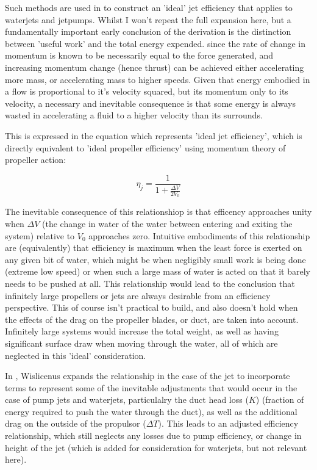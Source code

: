 \documentclass{article}\usepackage[]{graphicx}\usepackage[]{color}
\begin{document}
Such methods are used in \cite[8-14]{wislicenus1973} to construct an 'ideal' jet efficiency that applies to waterjets and jetpumps. Whilst I won't repeat the full expansion here, but a fundamentally important early conclusion of the derivation is the distinction between 'useful work' and the total energy expended. since the rate of change in momentum is known to be necessarily equal to the force generated, and increasing momentum change (hence thrust) can be achieved either accelerating more mass, or accelerating mass to higher speeds.   Given that energy embodied in a flow is proportional to it's velocity squared, but its momentum only to its velocity, a necessary and inevitable consequence is that some energy is always wasted in accelerating a fluid to a higher velocity than its surrounds.

This is expressed in the equation which represents 'ideal jet efficiency', which is directly equivalent to 'ideal propeller efficiency' using momentum theory of propeller action:

\begin{equation}
\label{eq:3}
\eta_j = \frac{1}{1+\frac{\Delta V}{2V_0}}
\end{equation}

The inevitable consequence of this relationshiop is that efficency approaches unity when $\Delta V$ (the change in water of the water between entering and exiting the system) relative to $V_0$ approaches zero.  Intuitive embodiments of this relationship are (equivalently) that efficiency is maximum when the least force is exerted on any given bit of water, which might be when negligibly small work is being done (extreme low speed) or when such a large mass of water is acted on that it barely needs to be pushed at all.  This relationship would lead to the conclusion that infinitely large propellers or jets are always desirable from an efficiency perspective.  This of course isn't practical to build, and also doesn't hold when the effects of the drag on the propeller blades, or duct, are taken into account.  Infinitely large systems would increase the total weight, as well as having significant surface draw when moving through the water, all of which are neglected in this 'ideal' consideration.

In \cite[8-14]{wislicenus1973}, Wislicenus expands the relationship in the case of the jet to incorporate terms to represent some of the inevitable adjustments that would occur in the case of pump jets and waterjets, particulalry the duct head loss ($K$) (fraction of energy required to push the water through the duct), as well as the additional drag on the outside of the propulsor ($\Delta T$).  This leads to an adjusted efficiency relationship, which still neglects any losses due to pump efficiency, or change in height of the jet (which is added for consideration for waterjets, but not relevant here).
\end{document}
